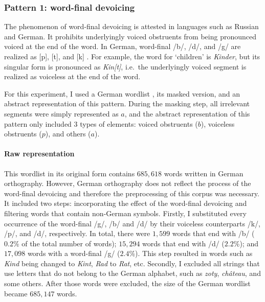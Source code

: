 \subsubsection{Pattern 1: word-final devoicing}

The phenomenon of word-final devoicing is attested in languages such as Russian and German.
It prohibits underlyingly voiced obstruents from being pronounced voiced at the end of the word.
In German, word-final /b/, /d/, and /g/ are realized as [p], [t], and [k] \citep{Wiebke1995}.
For example, the word for `children' is \emph{Kinder}, but its singular form is pronounced as \emph{Kin[t]}, i.e.\ the underlyingly voiced segment is realized as voiceless at the end of the word.

For this experiment, I used a German wordlist \href{https://github.com/enz/german-wordlist}{\faGithub} \citep{GHenz}, its masked version, and an abstract representation of this pattern.
During the masking step, all irrelevant segments were simply represented as $a$, and the abstract representation of this pattern only included $3$ types of elements: voiced obstruents ($b$), voiceless obstruents ($p$), and others ($a$).

\paragraph{Raw representation}

This wordlist in its original form contains $685,618$ words written in German orthography.
However, German orthography does not reflect the process of the word-final devoicing and therefore the preprocessing of this corpus was necessary.
It included two steps: incorporating the effect of the word-final devoicing and filtering words that contain non-German symbols.
Firstly, I substituted every occurrence of the word-final /g/, /b/ and /d/ by their voiceless counterparts /k/, /p/, and /d/, respectively.
In total, there were $1,599$ words that end with /b/ ($0.2$\% of the total number of words); $15,294$ words that end with /d/ ($2.2$\%); and $17,098$ words with a word-final /g/ ($2.4$\%).
This step resulted in words such as \emph{Kind} being changed to \emph{Kint}, \emph{Rad} to \emph{Rat}, etc.
Secondly, I excluded all strings that use letters that do not belong to the German alphabet, such as \emph{z\textbarl oty}, \emph{ch\^ateau}, and some others.
After those words were excluded, the size of the German wordlist became $685,147$ words.

